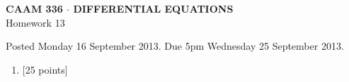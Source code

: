 \documentclass[10pt]{article}
\begin{document}
\vspace*{-5em}
\begin{center}
\large \textsf{\textbf{CAAM 336 $\cdot$ DIFFERENTIAL EQUATIONS}\\[0.5em]
Homework 13 }
\end{center}

Posted Monday 16 September 2013.  Due 5pm Wednesday 25 September 2013.

\begin{enumerate}\addtocounter{enumi}{10}
\item {[25 points]}\\  

\end{enumerate}
\end{document}

